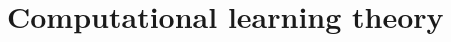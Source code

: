 \documentclass[../../note.tex]{subfiles}
\begin{document}
\section{Computational learning theory}
\end{document}
